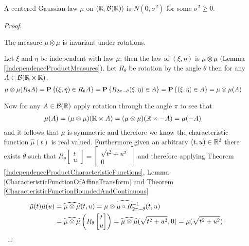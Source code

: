\begin{lem}A centered Gaussian law $\mu$ on $(\mathbb{R}, \mathcal{B}(\mathbb{R}))$ is $N(0,\sigma^2)$ for some $\sigma^2 \geq 0$.
\end{lem}
\begin{proof}
\begin{clm} The measure $\mu \otimes \mu$ is invariant under rotations.  
\end{clm}
Let $\xi$ and $\eta$ be independent with law $\mu$; then the law of $(\xi, \eta)$ is $\mu \otimes \mu$ (Lemma \ref{IndependenceProductMeasures}).  Let $R_\theta$ be rotation by the angle $\theta$
then for any $A \in \mathcal{B}(\mathbb{R} \times \mathbb{R})$,
\begin{align*}
\mu \otimes \mu (R_\theta A) &= \textbf{P}\left \{(\xi, \eta) \in R_\theta A \right \} = \textbf{P}\left \{R_{2 \pi - \theta} (\xi, \eta) \in A \right \} = \textbf{P}\left \{ (\xi, \eta) \in A \right \} = \mu \otimes \mu(A)
\end{align*}

Now for any $A \in \mathcal{B}(\mathbb{R})$ apply rotation through the angle $\pi$ to see that 
\begin{align*}
\mu(A) &= (\mu \otimes \mu)(\mathbb{R} \times A) = (\mu \otimes \mu)(\mathbb{R} \times -A) = \mu(-A)
\end{align*}
and it follows that $\mu$ is symmetric and therefore we know the characteristic function $\hat{\mu}(t)$ is real valued.  Furthermore given an 
arbitrary $(t,u) \in \mathbb{R}^2$ there exists $\theta$ such that $R_\theta \begin{bmatrix}  t \\ u \end{bmatrix} = \begin{bmatrix} \sqrt{t^2 + u^2} \\ 0 \end{bmatrix}$ and therefore
applying Theorem \ref{IndependenceProductCharacteristicFunctions}, Lemma \ref{CharacteristicFunctionOfAffineTransform} and Theorem \ref{CharacteristicFunctionBoundedAndContinuous}
\begin{align*}
\hat{\mu}(t) \hat{\mu}(u) &= \widehat{\mu \otimes \mu} (t,u) = \widehat{\mu \otimes \mu \circ R_{2\pi - \theta}^{-1}} (t,u) \\
&=\widehat{\mu \otimes \mu} \left (R_\theta \begin{bmatrix} t \\ u \end{bmatrix} \right ) = \widehat{\mu \otimes \mu} (\sqrt{t^2 + u^2}, 0) = \mu(\sqrt{t^2 + u^2})
\end{align*}


\end{proof}
